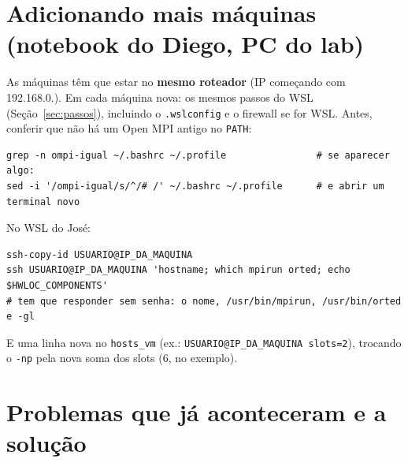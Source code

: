 \documentclass[a4paper,11pt]{article}
\begin{document}
\section{Adicionando mais máquinas (notebook do Diego, PC do lab)}
\label{sec:mais}

As máquinas têm que estar no \textbf{mesmo roteador} (IP começando com 192.168.0.). Em cada máquina nova: os mesmos passos do WSL (Seção~\ref{sec:passos}), incluindo o \texttt{.wslconfig} e o firewall se for WSL. Antes, conferir que não há um Open MPI antigo no \texttt{PATH}:

\begin{lstlisting}[style=sh]
grep -n ompi-igual ~/.bashrc ~/.profile                # se aparecer algo:
sed -i '/ompi-igual/s/^/# /' ~/.bashrc ~/.profile      # e abrir um terminal novo
\end{lstlisting}

No WSL do José:
\begin{lstlisting}[style=sh]
ssh-copy-id USUARIO@IP_DA_MAQUINA
ssh USUARIO@IP_DA_MAQUINA 'hostname; which mpirun orted; echo $HWLOC_COMPONENTS'
# tem que responder sem senha: o nome, /usr/bin/mpirun, /usr/bin/orted e -gl
\end{lstlisting}
E uma linha nova no \texttt{hosts\_vm} (ex.: \texttt{USUARIO@IP\_DA\_MAQUINA slots=2}), trocando o \texttt{-np} pela nova soma dos slots (6, no exemplo).

\section{Problemas que já aconteceram e a solução}
\end{document}
